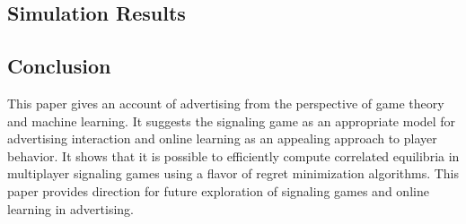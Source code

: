 \documentclass{article}
\begin{document}
\subsection{Simulation Results}

\subsection{Conclusion}
This paper gives an account of advertising from the perspective of game theory and machine learning. It suggests the signaling game as an appropriate model for advertising interaction and online learning as an appealing approach to player behavior. It shows that it is possible to efficiently compute correlated equilibria in multiplayer signaling games using a flavor of regret minimization algorithms. This paper provides direction for future exploration of signaling games and online learning in advertising.



\end{document}
